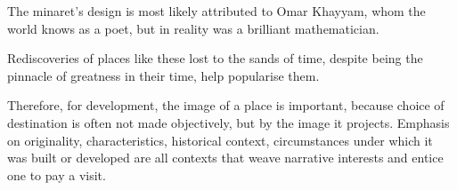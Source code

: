 \noindent The minaret's design is most likely attributed to Omar Khayyam, whom the world knows as a poet, but in reality was a brilliant mathematician.

Rediscoveries of places like these lost to the sands of time, despite being the pinnacle of greatness in their time, help popularise them.  

Therefore, for development, the image of a place is important, because choice of destination is often not made objectively, but by the image it projects. Emphasis on originality, characteristics, historical context, circumstances under which it was built or developed are all contexts that weave narrative interests and entice one to pay a visit.

